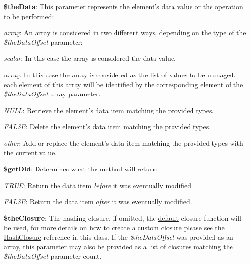 \begin{DoxyItemize}
\item {\bfseries \$the\-Data}\-: This parameter represents the element's data value or the operation to be performed\-: 
\begin{DoxyItemize}
\item {\itshape array}\-: An array is considered in two different ways, depending on the type of the {\itshape \$the\-Data\-Offset} parameter\-: 
\begin{DoxyItemize}
\item {\itshape scalar}\-: In this case the array is considered the data value. 
\item {\itshape array}\-: In this case the array is considered as the list of values to be managed\-: each element of this array will be identified by the corresponding element of the {\itshape \$the\-Data\-Offset} array parameter. 
\end{DoxyItemize}
\item {\itshape N\-U\-L\-L}\-: Retrieve the element's data item matching the provided types. 
\item {\itshape F\-A\-L\-S\-E}\-: Delete the element's data item matching the provided types. 
\item {\itshape other}\-: Add or replace the element's data item matching the provided types with the current value. 
\end{DoxyItemize}
\item {\bfseries \$get\-Old}\-: Determines what the method will return\-: 
\begin{DoxyItemize}
\item {\itshape T\-R\-U\-E}\-: Return the data item {\itshape before} it was eventually modified. 
\item {\itshape F\-A\-L\-S\-E}\-: Return the data item {\itshape after} it was eventually modified. 
\end{DoxyItemize}
\item {\bfseries \$the\-Closure}\-: The hashing closure, if omitted, the \hyperlink{class_c_attribute_af3647cf0f23e104446fa8ddf082461d7}{default} closure function will be used, for more details on how to create a custom closure please see the \hyperlink{class_c_attribute_af3647cf0f23e104446fa8ddf082461d7}{Hash\-Closure} reference in this class. If the {\itshape \$the\-Data\-Offset} was provided as an array, this parameter may also be provided as a list of closures matching the {\itshape \$the\-Data\-Offset} parameter count. 
\end{DoxyItemize}


